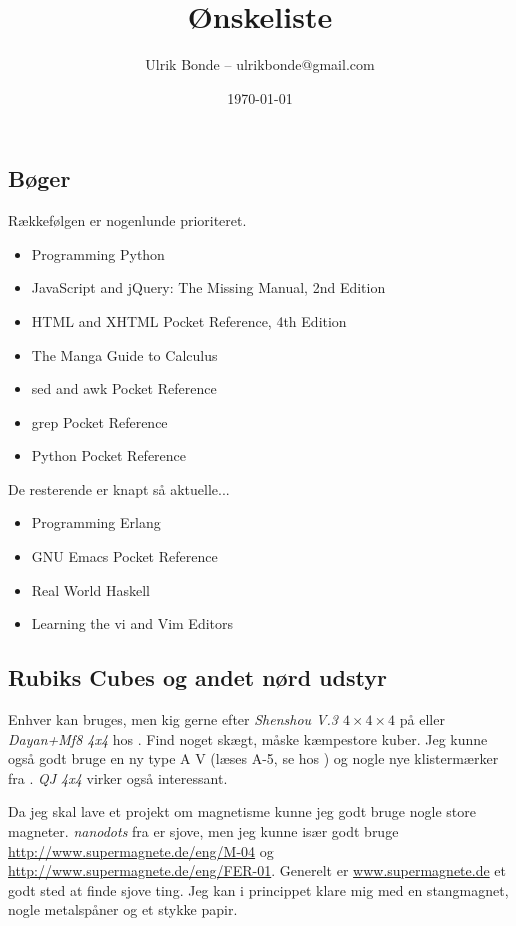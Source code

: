 \documentclass[a4paper, danish, 10pt, final]{article}
\title{Ønskeliste}
\author{Ulrik Bonde -- ulrikbonde@gmail.com}
\date{\today}
\begin{document}
\maketitle

\subsection*{Bøger}

Rækkefølgen er nogenlunde prioriteret.
\begin{itemize}
    \item Programming Python \citep{lutz2011progpython}
    \item JavaScript and jQuery: The Missing Manual, 2nd Edition \cite{javascriptjquery}
    \item HTML and XHTML Pocket Reference, 4th Edition \cite{htmlxhtml}
    \item The Manga Guide to Calculus \citep{kojima2009calc}
    \item sed and awk Pocket Reference \citep{robbins200206}
    \item grep Pocket Reference \citep{bambenekKlus200901}
    \item Python Pocket Reference \citep{lutz2009python}
\end{itemize}
De resterende er knapt så aktuelle...
\begin{itemize}
    \item Programming Erlang \citep{armstrong2007pe}
    \item GNU Emacs Pocket Reference \citep{cameron199811}
    \item Real World Haskell \citep{osullivanGoerzenStewart200812}
    \item Learning the vi and Vim Editors \citep{robbinsHannahLamb200807}
\end{itemize}

\subsection*{Rubiks Cubes og andet nørd udstyr}

Enhver kan bruges, men kig gerne efter \emph{Shenshou V.3 $4\times4\times4$} på
\cite{gamesweb} eller \emph{Dayan+Mf8 4x4} hos \cite{cubikon}. Find noget
skægt, måske kæmpestore kuber. Jeg kunne også godt bruge en ny type A V (læses
        A-5, se hos \cite{gamesweb}) og nogle nye klistermærker fra
\cite{cubesmith}. \emph{QJ 4x4} virker også interessant.

Da jeg skal lave et projekt om magnetisme kunne jeg godt bruge nogle store
magneter. \emph{nanodots} fra \cite{gamesweb} er sjove, men jeg kunne især godt
bruge \url{http://www.supermagnete.de/eng/M-04} og
\url{http://www.supermagnete.de/eng/FER-01}. Generelt er
\url{www.supermagnete.de} et godt sted at finde sjove ting. Jeg kan i
princippet klare mig med en stangmagnet, nogle metalspåner og et stykke papir.
\end{document}
